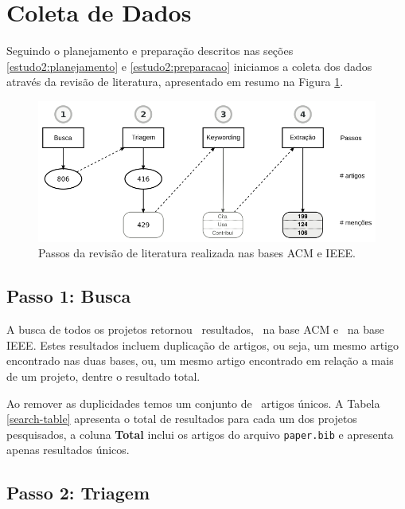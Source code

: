 
\section{Coleta de Dados} \label{estudo2:coleta} %

Seguindo o planejamento e preparação descritos nas seções
\ref{estudo2:planejamento} e \ref{estudo2:preparacao} iniciamos a coleta dos
dados através da revisão de literatura, apresentado em resumo na Figura \ref{estudo2-revisao-literatura}.

\begin{figure}[h]
  \center
  \includegraphics[scale=0.35]{imagens/estudo2-revisao-literatura.png}
  \caption{Passos da revisão de literatura realizada nas bases ACM e IEEE.}
  \label{estudo2-revisao-literatura}
\end{figure}


\subsection{Passo 1: Busca}

A busca de todos os projetos retornou \SearchCount \ resultados,
\SearchACMCount \ na base ACM e \SearchIEEECount \ na base IEEE.
Estes resultados incluem duplicação de artigos, ou seja,
um mesmo artigo encontrado nas duas bases, ou, um mesmo artigo
encontrado em relação a mais de um projeto, dentre o resultado total.

Ao remover as duplicidades temos um conjunto de \SearchUniqueCount \ artigos
únicos.  A Tabela \ref{search-table} apresenta o total de resultados para cada
um dos projetos pesquisados, a coluna {\bf Total} inclui os artigos do arquivo
\texttt{paper.bib} e apresenta apenas resultados únicos.



\subsection{Passo 2: Triagem}

